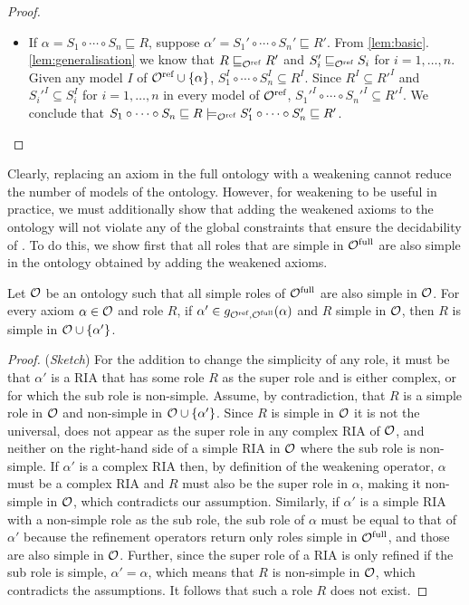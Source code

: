 \begin{proof}
\begin{itemize}
    \item If $\alpha = S_1 \circ \cdots \circ S_n \sqsubseteq R$, suppose $\alpha' = S_1' \circ \cdots \circ S_n' \sqsubseteq R'$. From \cref{lem:basic}.\ref{lem:generalisation} we know that $R \sqsubseteq_{\mathcal{O}^\textnormal{ref}} R'$ and $S_i' \sqsubseteq_{\mathcal{O}^\textnormal{ref}} S_i$ for $i = 1, \dots, n$. Given any model $I$ of ${\mathcal{O}^\textnormal{ref}} \cup \{ \alpha \}$, $S_1^I \circ \cdots \circ S_n^I \subseteq R^I$. Since $R^I \subseteq R'^I$ and $S_i'^I \subseteq S_i^I$ for $i = 1, \dots, n$ in every model of ${\mathcal{O}^\textnormal{ref}}$, $S_1'^I \circ \cdots \circ S_n'^I \subseteq R'^I$. We conclude that $S_1 \circ \cdots \circ S_n \sqsubseteq R \models_{\mathcal{O}^\textnormal{ref}} S_1' \circ \cdots \circ S_n' \sqsubseteq R'$.
\end{itemize}
\end{proof}

Clearly, replacing an axiom in the full ontology with a weakening cannot reduce the number of models of the ontology. However, for weakening to be useful in practice, we must additionally show that adding the weakened axioms to the ontology will not violate any of the global constraints that ensure the decidability of \SROIQ. To do this, we show first that all roles that are simple in ${\mathcal{O}^\textnormal{full}}$ are also simple in the ontology obtained by adding the weakened axioms.

\begin{lemma} \label{lem:simple-roles}
Let $\mathcal{O}$ be an ontology such that all simple roles of ${\mathcal{O}^\textnormal{full}}$ are also simple in $\mathcal{O}$. For every axiom $\alpha \in \mathcal{O}$ and role $R$, if $\alpha' \in g_{{\mathcal{O}^\textnormal{ref}},{\mathcal{O}^\textnormal{full}}}(\alpha)$ and $R$ simple in $\mathcal{O}$, then $R$ is simple in $\mathcal{O} \cup \{ \alpha' \}$.
\end{lemma}

\begin{proof}(\emph{Sketch})
For the addition to change the simplicity of any role, it must be that $\alpha'$ is a RIA that has some role $R$ as the super role and is either complex, or for which the sub role is non-simple. Assume, by contradiction, that $R$ is a simple role in $\mathcal{O}$ and non-simple in $\mathcal{O} \cup \{ \alpha' \}$. Since $R$ is simple in $\mathcal{O}$ it is not the universal, does not appear as the super role in any complex RIA of $\mathcal{O}$, and neither on the right-hand side of a simple RIA in $\mathcal{O}$ where the sub role is non-simple. If $\alpha'$ is a complex RIA then, by definition of the weakening operator, $\alpha$ must be a complex RIA and $R$ must also be the super role in $\alpha$, making it non-simple in $\mathcal{O}$, which contradicts our assumption. Similarly, if $\alpha'$ is a simple RIA with a non-simple role as the sub role, the sub role of $\alpha$ must be equal to that of $\alpha'$ because the refinement operators return only roles simple in ${\mathcal{O}^\textnormal{full}}$, and those are also simple in $\mathcal{O}$. Further, since the super role of a RIA is only refined if the sub role is simple, $\alpha' = \alpha$, which means that $R$ is non-simple in $\mathcal{O}$, which contradicts the assumptions. It follows that such a role $R$ does not exist.
\end{proof}

